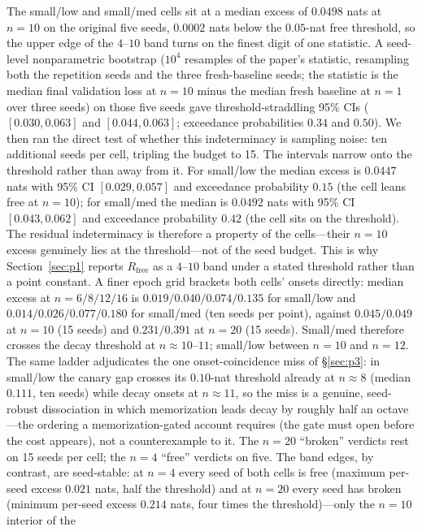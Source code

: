 \documentclass[11pt]{article}
\begin{document}
The small/low and small/med cells sit at a median excess of $0.0498$ nats at $n=10$ on
the original five seeds, $0.0002$ nats below the $0.05$-nat free threshold, so the upper
edge of the $4$--$10$ band turns on the finest digit of one statistic. A seed-level
nonparametric bootstrap ($10^{4}$ resamples of the paper's statistic, resampling both
the repetition seeds and the three fresh-baseline seeds; the statistic is the median final
validation loss at $n{=}10$ minus the median fresh baseline at $n{=}1$ over three seeds)
on those five seeds gave threshold-straddling 95\% CIs ($[0.030,0.063]$ and
$[0.044,0.063]$; exceedance probabilities $0.34$ and $0.50$). We then ran the direct
test of whether this indeterminacy is sampling noise: ten additional seeds per cell,
tripling the budget to 15. The intervals narrow onto the threshold rather than away
from it. For small/low the median excess is $0.0447$ nats with 95\% CI
$[0.029, 0.057]$ and exceedance probability $0.15$ (the cell leans free at $n{=}10$);
for small/med the median is $0.0492$ nats with 95\% CI $[0.043, 0.062]$ and exceedance
probability $0.42$ (the cell sits on the threshold). The residual indeterminacy is
therefore a property of the cells---their $n{=}10$ excess genuinely lies at the
threshold---not of the seed budget. This is why Section~\ref{sec:p1} reports
$R_{\mathrm{free}}$ as a $4$--$10$ band under a stated threshold rather than a point
constant. A finer epoch grid brackets both cells' onsets directly: median excess at
$n=6/8/12/16$ is $0.019/0.040/0.074/0.135$ for small/low and $0.014/0.026/0.077/0.180$
for small/med (ten seeds per point), against $0.045/0.049$ at $n=10$ (15 seeds) and
$0.231/0.391$ at $n=20$ (15 seeds). Small/med therefore crosses the decay threshold at
$n\approx10$--$11$; small/low between $n=10$ and $n=12$. The same ladder adjudicates the
one onset-coincidence miss of \S\ref{sec:p3}: in small/low the canary gap crosses its
$0.10$-nat threshold already at $n\approx8$ (median $0.111$, ten seeds) while decay
onsets at $n\approx11$, so the miss is a genuine, seed-robust dissociation in which
memorization leads decay by roughly half an octave---the ordering a memorization-gated
account requires (the gate must open before the cost appears), not a counterexample to
it. The $n=20$ ``broken'' verdicts rest on 15 seeds per cell; the $n=4$ ``free''
verdicts on five. The band edges, by
contrast, are seed-stable: at $n=4$ every seed of both cells is free (maximum per-seed
excess $0.021$ nats, half the threshold) and at $n=20$ every seed has broken (minimum
per-seed excess $0.214$ nats, four times the threshold)---only the $n=10$ interior of the
\end{document}
